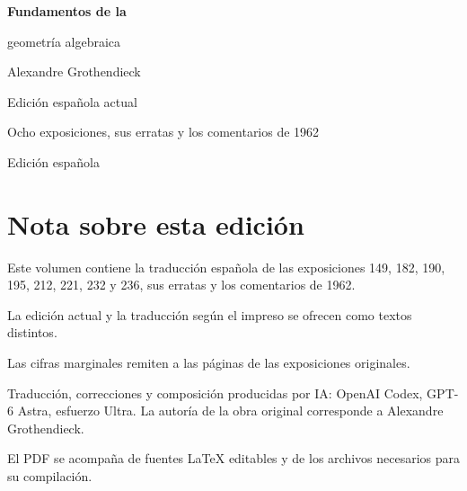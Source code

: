 \documentclass[11pt,twoside,openany]{book}
\newcommand{\FgaUnitKey}{frontmatter}
\theoremstyle{plain}
\theoremstyle{definition}
\theoremstyle{remark}
\begin{document}
\frontmatter
\begin{titlepage}
\centering
\vspace*{0.13\textheight}
{\Huge\bfseries Fundamentos de la\par geometría algebraica\par}
\vspace{1.5\baselineskip}
{\Large Alexandre Grothendieck\par}
\vfill
{\Large Edición española actual\par}
\vspace{\baselineskip}
{\large Ocho exposiciones, sus erratas y los comentarios de 1962\par}
\vspace{1.5\baselineskip}
{\normalsize Edición española\par}
\end{titlepage}
\chapter*{Nota sobre esta edición}
Este volumen contiene la traducción española de las exposiciones 149, 182, 190, 195, 212, 221, 232 y 236, sus erratas y los comentarios de 1962.

La edición actual y la traducción según el impreso se ofrecen como textos distintos.

Las cifras marginales remiten a las páginas de las exposiciones originales.

Traducción, correcciones y composición producidas por IA: OpenAI Codex, GPT-6 Astra, esfuerzo Ultra.
La autoría de la obra original corresponde a Alexandre Grothendieck.

El PDF se acompaña de fuentes LaTeX editables y de los archivos necesarios para su compilación.

\tableofcontents
\mainmatter
\def\FgaUnitKey{149}
\def\FgaUnitKey{e149}
\def\FgaUnitKey{182}
\def\FgaUnitKey{e182}
\def\FgaUnitKey{190}
\def\FgaUnitKey{e190}
\def\FgaUnitKey{195}
\def\FgaUnitKey{e195}
\def\FgaUnitKey{212}
\def\FgaUnitKey{e212}
\def\FgaUnitKey{221}
\def\FgaUnitKey{e221}
\def\FgaUnitKey{232}
\def\FgaUnitKey{e232}
\def\FgaUnitKey{236}
\def\FgaUnitKey{e236}
\def\FgaUnitKey{com}
\end{document}
